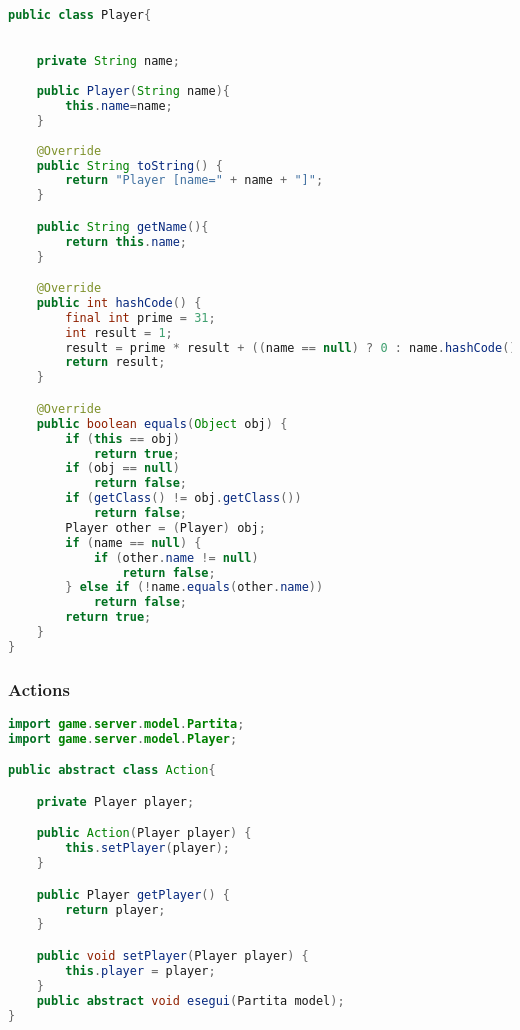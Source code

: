 \documentclass{article}
\begin{document}
\begin{lstlisting}[language=Java,escapechar=|]
public class Player{

	
	private String name;
	
	public Player(String name){
		this.name=name;
	}
	
	@Override
	public String toString() {
		return "Player [name=" + name + "]";
	}

	public String getName(){
		return this.name;
	}

	@Override
	public int hashCode() {
		final int prime = 31;
		int result = 1;
		result = prime * result + ((name == null) ? 0 : name.hashCode());
		return result;
	}

	@Override
	public boolean equals(Object obj) {
		if (this == obj)
			return true;
		if (obj == null)
			return false;
		if (getClass() != obj.getClass())
			return false;
		Player other = (Player) obj;
		if (name == null) {
			if (other.name != null)
				return false;
		} else if (!name.equals(other.name))
			return false;
		return true;
	}
}
\end{lstlisting}

\subsubsection{Actions}
\begin{lstlisting}[language=Java,escapechar=|]
import game.server.model.Partita;
import game.server.model.Player;

public abstract class Action{

	private Player player;

	public Action(Player player) {
		this.setPlayer(player);
	}

	public Player getPlayer() {
		return player;
	}

	public void setPlayer(Player player) {
		this.player = player;
	}
	public abstract void esegui(Partita model);
}
\end{lstlisting}
\end{document}

